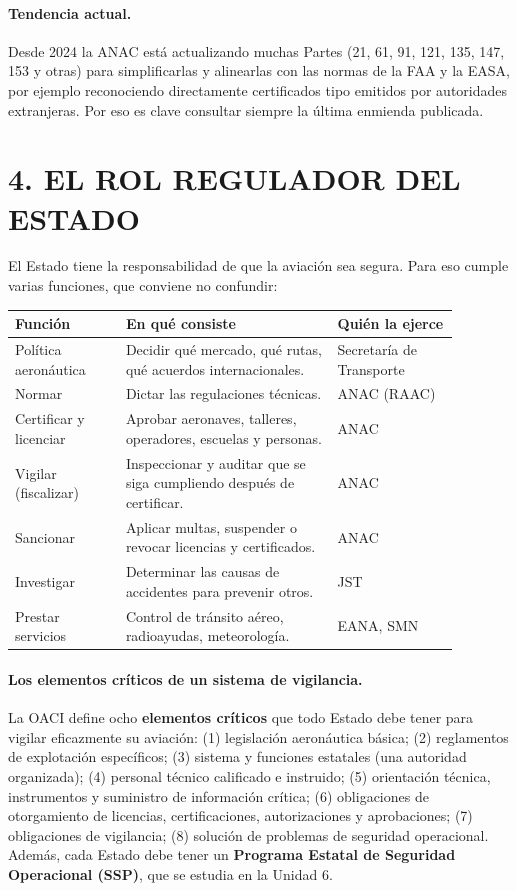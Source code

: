 \paragraph*{Tendencia actual.}
Desde 2024 la ANAC está actualizando muchas Partes (21, 61, 91, 121, 135, 147, 153 y otras) para
simplificarlas y alinearlas con las normas de la FAA y la EASA, por ejemplo reconociendo
directamente certificados tipo emitidos por autoridades extranjeras. Por eso es clave consultar
siempre la última enmienda publicada.

\clearpage
\section*{4. EL ROL REGULADOR DEL ESTADO}

El Estado tiene la responsabilidad de que la aviación sea segura. Para eso cumple varias
funciones, que conviene no confundir:

\begin{center}
\small
\begin{tabular}{|p{0.22\linewidth}|p{0.42\linewidth}|p{0.24\linewidth}|}
\hline
\textbf{Función} & \textbf{En qué consiste} & \textbf{Quién la ejerce} \\ \hline
Política aeronáutica & Decidir qué mercado, qué rutas, qué acuerdos internacionales. &
Secretaría de Transporte \\ \hline
Normar & Dictar las regulaciones técnicas. & ANAC (RAAC) \\ \hline
Certificar y licenciar & Aprobar aeronaves, talleres, operadores, escuelas y personas. & ANAC \\
\hline
Vigilar (fiscalizar) & Inspeccionar y auditar que se siga cumpliendo después de certificar. &
ANAC \\ \hline
Sancionar & Aplicar multas, suspender o revocar licencias y certificados. & ANAC \\ \hline
Investigar & Determinar las causas de accidentes para prevenir otros. & JST \\ \hline
Prestar servicios & Control de tránsito aéreo, radioayudas, meteorología. & EANA, SMN \\ \hline
\end{tabular}
\end{center}

\paragraph*{Los elementos críticos de un sistema de vigilancia.}
La OACI define ocho \textbf{elementos críticos} que todo Estado debe tener para vigilar
eficazmente su aviación: (1) legislación aeronáutica básica; (2) reglamentos de explotación
específicos; (3) sistema y funciones estatales (una autoridad organizada); (4) personal técnico
calificado e instruido; (5) orientación técnica, instrumentos y suministro de información crítica;
(6) obligaciones de otorgamiento de licencias, certificaciones, autorizaciones y aprobaciones;
(7) obligaciones de vigilancia; (8) solución de problemas de seguridad operacional. Además, cada
Estado debe tener un \textbf{Programa Estatal de Seguridad Operacional (SSP)}, que se estudia en
la Unidad 6.

